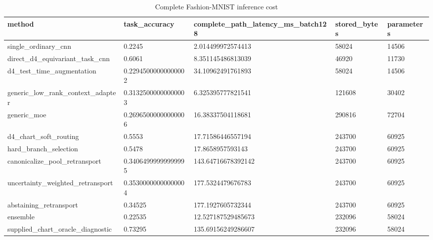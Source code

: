 \begin{table}[t]
\centering
\caption{Complete Fashion-MNIST inference cost}
\begin{tabular}{lllll}
\toprule
method & task\_accuracy & complete\_path\_latency\_ms\_batch128 & stored\_bytes & parameters \\
\midrule
single\_ordinary\_cnn & 0.2245 & 2.014499972574413 & 58024 & 14506 \\
direct\_d4\_equivariant\_task\_cnn & 0.6061 & 8.351145486813039 & 46920 & 11730 \\
d4\_test\_time\_augmentation & 0.22945000000000002 & 34.10962491761893 & 58024 & 14506 \\
generic\_low\_rank\_context\_adapter & 0.31325000000000003 & 6.325395777821541 & 121608 & 30402 \\
generic\_moe & 0.26965000000000006 & 16.38337504118681 & 290816 & 72704 \\
d4\_chart\_soft\_routing & 0.5553 & 17.71586446557194 & 243700 & 60925 \\
hard\_branch\_selection & 0.5478 & 17.8658957593143 & 243700 & 60925 \\
canonicalize\_pool\_retransport & 0.34064999999999995 & 143.64716678392142 & 243700 & 60925 \\
uncertainty\_weighted\_retransport & 0.35300000000000004 & 177.5324479676783 & 243700 & 60925 \\
abstaining\_retransport & 0.34525 & 177.1927605732344 & 243700 & 60925 \\
ensemble & 0.22535 & 12.527187529485673 & 232096 & 58024 \\
supplied\_chart\_oracle\_diagnostic & 0.73295 & 135.69156249286607 & 232096 & 58024 \\
\bottomrule
\end{tabular}
\end{table}
